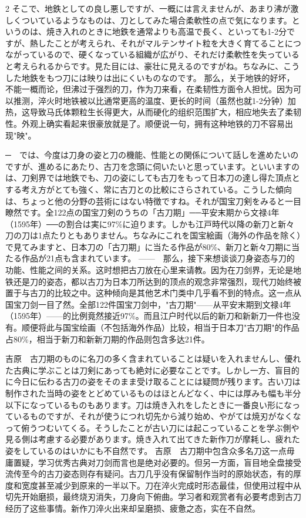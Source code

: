 \documentclass[12pt,UTF8]{ctexbook}
\begin{document}
\begin{paracol}{2}
そこで、地鉄としての良し悪しですが、一概には言えませんが、あまり沸が激しくついているようなものは、刀としてみた場合柔軟性の点で気になります。というのは、焼き入れのときに地鉄を通常よりも高温で長く、といっても1-2分ですが、熱したことが考えられ、それがマルテンサイト粒を大きく育てることにつながっているので、硬くなっている組織が広がり、それだけ柔軟性を失っていると考えられるからです。見た目には、豪壮に見えるのですがね。ちなみに、こうした地鉄をもつ刀には映りは出にくいものなのです。
\switchcolumn*
那么，关于地铁的好坏，不能一概而论，但沸过于强烈的刀，作为刀来看，在柔韧性方面令人担忧。因为可以推测，淬火时地铁被以比通常更高的温度、更长的时间（虽然也就1-2分钟）加热，这导致马氏体颗粒生长得更大，从而硬化的组织范围扩大，相应地失去了柔韧性。外观上确实看起来很豪放就是了。顺便说一句，拥有这种地铁的刀不容易出现"映"。
\switchcolumn*

─　では、今度は刀身の姿と刀の機能、性能との関係について話しを進めたいのですが、進めるにあたり、古刀を念頭に伺いたいと思っています。といいますのは、刀剣界では地鉄でも、刀の姿にしても古刀をもって日本刀の達し得た頂点とする考え方がとても強く、常に古刀との比較にさらされている。こうした傾向は、ちょっと他の分野の芸術にはない特徴ですね。それが国宝刀剣をみると一目瞭然です。全122点の国宝刀剣のうちの「古刀期」──平安末期から文禄4年（1595年）──の割合は実に97\%に迫ります。しかも江戸時代以降の新刀と新々刀の刀は1点たりともありません。ちなみにこれを国宝絵画（海外の作品を除く）で見てみますと、日本刀の「古刀期」に当たる作品が80\%、新刀と新々刀期に当たる作品が21点も含まれています。
\switchcolumn*
——　那么，接下来想谈谈刀身姿态与刀的功能、性能之间的关系。这时想把古刀放在心里来请教。因为在刀剑界，无论是地铁还是刀的姿态，都以古刀为日本刀所达到的顶点的观念非常强烈，现代刀始终被置于与古刀的比较之中。这种倾向是其他艺术门类中几乎看不到的特点。这一点从国宝刀剑一目了然。全部122件国宝刀剑中，"古刀期"——从平安末期到文禄4年（1595年）——的比例竟然接近97\%。而且江户时代以后的新刀和新新刀一件也没有。顺便将此与国宝绘画（不包括海外作品）比较，相当于日本刀"古刀期"的作品占80\%，相当于新刀和新新刀期的作品则包含多达21件。
\switchcolumn*

吉原　古刀期のものに名刀の多く含まれていることは疑いを入れませんし、優れた古典に学ぶことは刀剣にあっても絶対に必要なことです。しかし一方、盲目的に今日に伝わる古刀の姿をそのまま受け取ることには疑問が残ります。古い刀は制作された当時の姿をとどめているものはほとんどなく、中には厚みも幅も半分以下になっているものもあります。刀は焼き入れをしたときに一番良い形になっているものですが、それが使うにつれ切先から減り始め、やがては焼刃がなくなって俯うつむいてくる。そうしたことが古い刀には起こっていることを学ぶ側や見る側は考慮する必要があります。焼き入れて出てきた新作刀が摩耗し、疲れた姿をしているのはいかにも不自然です。
\switchcolumn*
吉原　古刀期中包含众多名刀这一点毋庸置疑，学习优秀古典对刀剑而言也是绝对必要的。但另一方面，盲目地全盘接受流传至今的古刀姿态则存有疑问。古刀几乎没有保留制作当时的原始状态，有的厚度和宽度甚至减少到原来的一半以下。刀在淬火完成时形态最佳，但使用过程中从切先开始磨损，最终烧刃消失，刀身向下俯曲。学习者和观赏者有必要考虑到古刀经历了这些事情。新作刀淬火出来却呈磨损、疲惫之态，实在不自然。
\switchcolumn*


\end{paracol}
\end{document}
